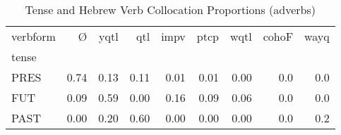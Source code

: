 \begin{table}[htbp!]
\centering
\caption{Tense and Hebrew Verb Collocation Proportions (adverbs)}
\label{table:advb_tense_pr}
\begin{tabular}{lrrrrrrrr}
\toprule
verbform &     Ø &  yqtl &   qtl &  impv &  ptcp &  wqtl &  cohoF &  wayq \\
tense &       &       &       &       &       &       &        &       \\
\midrule
PRES  &  0.74 &  0.13 &  0.11 &  0.01 &  0.01 &  0.00 &    0.0 &   0.0 \\
FUT   &  0.09 &  0.59 &  0.00 &  0.16 &  0.09 &  0.06 &    0.0 &   0.0 \\
PAST  &  0.00 &  0.20 &  0.60 &  0.00 &  0.00 &  0.00 &    0.0 &   0.2 \\
\bottomrule
\end{tabular}
\end{table}
